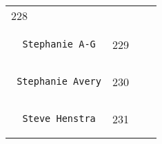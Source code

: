 \documentclass[]{article}
\begin{document}
\begin{longtable}[c]{@{}llll@{}}
\begin{minipage}[t]{0.10\columnwidth}
228
\end{minipage} & \begin{minipage}[t]{0.13\columnwidth}\raggedright
\end{minipage} & \begin{minipage}[t]{0.15\columnwidth}\raggedright
\end{minipage}
\\\noalign{\medskip}
\begin{minipage}[t]{0.39\columnwidth}\raggedright
\begin{verbatim}
  Stephanie A-G
\end{verbatim}
\end{minipage} & \begin{minipage}[t]{0.10\columnwidth}\raggedright
229
\end{minipage} & \begin{minipage}[t]{0.13\columnwidth}\raggedright
\end{minipage} & \begin{minipage}[t]{0.15\columnwidth}\raggedright
\end{minipage}
\\\noalign{\medskip}
\begin{minipage}[t]{0.39\columnwidth}\raggedright
\begin{verbatim}
 Stephanie Avery
\end{verbatim}
\end{minipage} & \begin{minipage}[t]{0.10\columnwidth}\raggedright
230
\end{minipage} & \begin{minipage}[t]{0.13\columnwidth}\raggedright
\end{minipage} & \begin{minipage}[t]{0.15\columnwidth}\raggedright
\end{minipage}
\\\noalign{\medskip}
\begin{minipage}[t]{0.39\columnwidth}\raggedright
\begin{verbatim}
  Steve Henstra
\end{verbatim}
\end{minipage} & \begin{minipage}[t]{0.10\columnwidth}\raggedright
231
\end{minipage} & \begin{minipage}[t]{0.13\columnwidth}\raggedright
\end{minipage} & \begin{minipage}[t]{0.15\columnwidth}\raggedright

\end{minipage}
\end{longtable}
\end{document}

